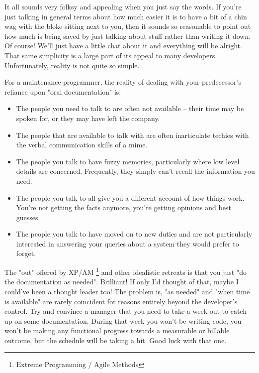 \documentclass{article}
\begin{document}
It all sounds very folksy and appealing when you just say the words. If
you're just talking in general terms about how much easier it is to have
a bit of a chin wag with the bloke sitting next to you, then it sounds
so reasonable to point out how much is being saved by just talking about
stuff rather than writing it down. Of course! We'll just have a little
chat about it and everything will be alright. That same simplicity is a
large part of its appeal to many developers. Unfortunately, reality is
not quite so simple.

For a maintenance programmer, the reality of dealing with your
predecessor's reliance upon "oral documentation" is:

\begin{itemize}
\item The people you need to talk to are often not available -- their time
may be spoken for, or they may have left the company.\\
\item The people that are available to talk with are often inarticulate
techies with the verbal communication skills of a mime.\\
\item The people you talk to have fuzzy memories, particularly where low
level details are concerned. Frequently, they simply can't recall the
information you need.\\
\item The people you talk to all give you a different account of how things
work. You're not getting the facts anymore, you're getting opinions
and best guesses.\\
\item The people you talk to have moved on to new duties and are not
particularly interested in answering your queries about a system they
would prefer to forget.
\end{itemize}

The "out" offered by XP/AM \footnote{Extreme Programming / Agile Methods} and other idealistic retreats is that
you just "do the documentation as needed". Brilliant! If only I'd
thought of that, maybe I could've been a thought leader too! The problem
is, "as needed" and "when time is available" are rarely coincident for
reasons entirely beyond the developer's control. Try and convince a
manager that you need to take a week out to catch up on some
documentation. During that week you won't be writing code, you won't be
making any functional progress towards a measurable or billable outcome,
but the schedule will be taking a hit. Good luck with that one.
\end{document}
